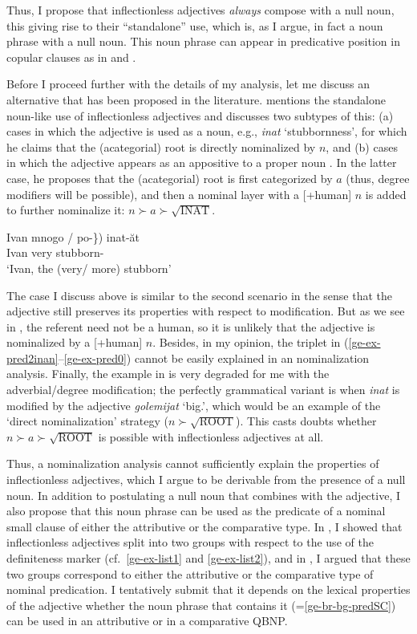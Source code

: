 \documentclass[output=paper]{langscibook}
\begin{document}
Thus, I propose that inflectionless adjectives \emph{always} compose with a null noun, this giving rise to their ``standalone'' use, which is, as I argue, in fact a noun phrase with a null noun. This noun phrase can appear in predicative position in copular clauses as in  and .\largerpage

Before I proceed further with the details of my analysis, let me discuss an alternative that has been proposed in the literature. \citet[100--103]{Adamson2019PhD} mentions the standalone noun-like use of inflectionless adjectives and discusses two subtypes of this: (a) cases in which the adjective is used as a noun, e.g., \emph{inat} `stubbornness', for which he claims that the (acategorial) root is directly nominalized by $n$, and (b) cases in which the adjective appears as an appositive to a proper noun . In the latter case, he proposes that the (acategorial) root is first categorized by $a$ (thus, degree modifiers will be possible), and then a nominal layer with a [+human] $n$ is added to further nominalize it: $n \succ a \succ \sqrt{\text{INAT}}$.

\ea \label{ge-ex-appos}
\gll Ivan \minsp{(\{} mnogo / po-\}) inat-\u{a}t\\
Ivan {} very {} \Cmpr{} stubborn-\Def{}\\
\glt `Ivan, the (very/ more) stubborn' \hfill \citep[102]{Adamson2019PhD}
\z

\noindent The case I discuss above is similar to the second scenario in the sense that the adjective still preserves its properties with respect to modification. But as we see in , the referent need not be a human, so it is unlikely that the adjective is nominalized by a [+human] $n$. Besides, in my opinion, the triplet in (\ref{ge-ex-pred2inan}--\ref{ge-ex-pred0}) cannot be easily explained in an nominalization analysis. Finally, the example in  is very degraded for me with the adverbial\slash degree modification; the perfectly grammatical variant is when \emph{inat} is modified by the adjective \emph{golemijat} `big.\Def{}', which would be an example of the `direct nominalization' strategy ($n \succ \sqrt{\text{ROOT}}$). This casts doubts whether $n \succ a \succ \sqrt{\text{ROOT}}$ is possible with inflectionless adjectives at all.

Thus, a nominalization analysis cannot sufficiently explain the properties of inflectionless adjectives, which I argue to be derivable from the presence of a null noun. In addition to postulating a null noun that combines with the adjective, I also propose that this noun phrase can be used as the predicate of a nominal small clause of either the attributive or the comparative type. In , I showed that inflectionless adjectives split into two groups with respect to the use of the definiteness marker (cf.\ \ref{ge-ex-list1} and \ref{ge-ex-list2}), and in , I argued that these two groups correspond to either the attributive or the comparative type of nominal predication. I tentatively submit that it depends on the lexical properties of the adjective whether the noun phrase that contains it (=\ref{ge-br-bg-predSC}) can be used in an attributive or in a comparative QBNP. 
\end{document}
